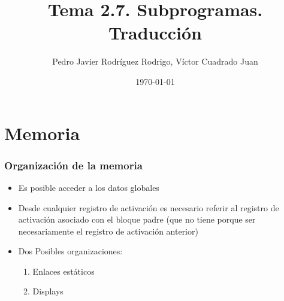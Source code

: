 \documentclass[hyperref={pdfpagelabels=false},tree-dvips,compress]{beamer}
\title{Tema 2.7. Subprogramas. Traducción}
\author{Pedro Javier Rodríguez Rodrigo, Víctor Cuadrado Juan}
\date{\today}
\begin{document}
\begin{frame}
\titlepage
\end{frame}
\section{Memoria}
\begin{frame}[fragile]
\frametitle{Organización de la memoria}

\begin{itemize}[<+->]%
	\item Es posible acceder a los datos globales
	\item Desde cualquier registro de activación es necesario referir al registro de activación asociado con el bloque padre (que no tiene porque ser necesariamente el registro de activación anterior)
	\item Dos Posibles organizaciones:
		\begin{enumerate}[<+->]
			\item Enlaces estáticos
			\item Displays
		\end{enumerate}
\end{itemize}

\end{frame}
\end{document}
